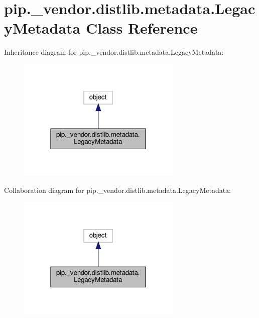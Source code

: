 \hypertarget{classpip_1_1__vendor_1_1distlib_1_1metadata_1_1LegacyMetadata}{}\section{pip.\+\_\+vendor.\+distlib.\+metadata.\+Legacy\+Metadata Class Reference}
\label{classpip_1_1__vendor_1_1distlib_1_1metadata_1_1LegacyMetadata}


Inheritance diagram for pip.\+\_\+vendor.\+distlib.\+metadata.\+Legacy\+Metadata\+:
\nopagebreak
\begin{figure}[H]
\begin{center}
\leavevmode
\includegraphics[width=222pt]{classpip_1_1__vendor_1_1distlib_1_1metadata_1_1LegacyMetadata__inherit__graph}
\end{center}
\end{figure}


Collaboration diagram for pip.\+\_\+vendor.\+distlib.\+metadata.\+Legacy\+Metadata\+:
\nopagebreak
\begin{figure}[H]
\begin{center}
\leavevmode
\includegraphics[width=222pt]{classpip_1_1__vendor_1_1distlib_1_1metadata_1_1LegacyMetadata__coll__graph}
\end{center}
\end{figure}
